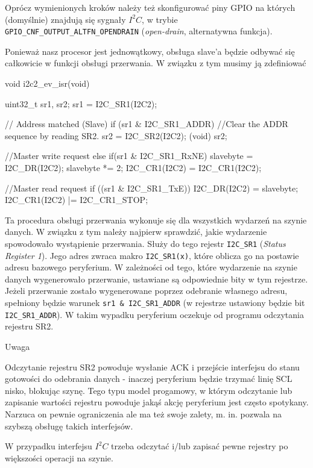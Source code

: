 \documentclass{pdfBooklets}
\begin{document}
Oprócz wymienionych kroków należy też skonfigurować piny GPIO na których (domyślnie) znajdują się sygnały $I^2C$, w trybie
\Verb$GPIO_CNF_OUTPUT_ALTFN_OPENDRAIN$ (\textit{open-drain}, alternatywna funkcja).

Ponieważ nasz procesor jest jednowątkowy, obsługa slave'a będzie odbywać się całkowicie w funkcji obsługi przerwania. W związku z tym musimy ją
zdefiniować
\begin{CodeFrame*}[c]{}
void i2c2_ev_isr(void){
  
  uint32_t sr1, sr2;
  sr1 = I2C_SR1(I2C2);

  // Address matched (Slave)
  if (sr1 & I2C_SR1_ADDR){
    //Clear the ADDR sequence by reading SR2.
    sr2 = I2C_SR2(I2C2);
    (void) sr2;	
  }

  //Master write request
  else if(sr1 & I2C_SR1_RxNE){
    slavebyte = I2C_DR(I2C2);
    slavebyte *= 2;
    I2C_CR1(I2C2) = I2C_CR1(I2C2);
  }
  
  //Master read request
  if ((sr1 & I2C_SR1_TxE)){
    I2C_DR(I2C2) = slavebyte;
    I2C_CR1(I2C2) |= I2C_CR1_STOP;
  }
}
\end{CodeFrame*}

Ta procedura obsługi przerwania wykonuje się dla wszystkich wydarzeń na szynie danych. W związku z tym należy najpierw sprawdzić, jakie wydarzenie
spowodowało wystąpienie przerwania. Służy do tego rejestr \Verb$I2C_SR1$ (\textit{Status Register 1}). Jego adres zwraca makro \Verb$I2C_SR1(x)$,
które oblicza go na postawie adresu bazowego peryferium. W zależności od tego, które wydarzenie na szynie danych wygenerowało przerwanie, ustawiane
są odpowiednie bity w tym rejestrze.\\

Jeżeli przerwanie zostało wygenerowane poprzez odebranie własnego adresu, spełniony będzie warunek \Verb$sr1 & I2C_SR1_ADDR$ (w rejestrze ustawiony
będzie bit \Verb$I2C_SR1_ADDR$). W takim wypadku peryferium oczekuje od programu odczytania rejestru SR2.

\begin{Ramka}{Uwaga}\begin{center}
Odczytanie rejestru SR2 powoduje wysłanie ACK i przejście interfejsu do stanu gotowości do odebrania danych - inaczej peryferium będzie
trzymać linię SCL nisko, blokując szynę. Tego typu model progamowy, w którym odczytanie lub zapisanie wartości rejestru powoduje
jakąś akcję peryferium jest często spotykany. Narzuca on pewnie ograniczenia ale ma też swoje zalety, m. in. pozwala na szybszą obsługę takich
interfejsów.

W przypadku interfejsu $I^2C$ trzeba odczytać i/lub zapisać pewne rejestry po większości operacji na szynie.
\end{center}\end{Ramka}
\end{document}
